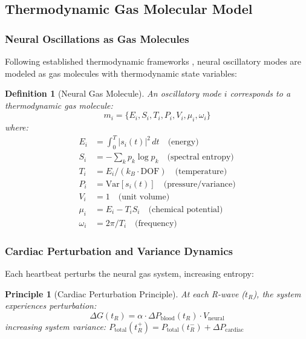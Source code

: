 \documentclass[12pt]{article}
\newtheorem{definition}[theorem]{Definition}
\newtheorem{principle}[theorem]{Principle}
\theoremstyle{remark}
\begin{document}
\subsection{Thermodynamic Gas Molecular Model}

\subsubsection{Neural Oscillations as Gas Molecules}

Following established thermodynamic frameworks \citep{friston2006free,sagawa2012thermodynamics}, neural oscillatory modes are modeled as gas molecules with thermodynamic state variables:

\begin{definition}[Neural Gas Molecule]
An oscillatory mode $i$ corresponds to a thermodynamic gas molecule:
\begin{equation}
m_i = \{E_i, S_i, T_i, P_i, V_i, \mu_i, \omega_i\}
\end{equation}
where:
\begin{align}
E_i &= \int_0^T |s_i(t)|^2 \, dt \quad \text{(energy)} \\
S_i &= -\sum_k p_k \log p_k \quad \text{(spectral entropy)} \\
T_i &= E_i / (k_B \cdot \text{DOF}) \quad \text{(temperature)} \\
P_i &= \text{Var}[s_i(t)] \quad \text{(pressure/variance)} \\
V_i &= 1 \quad \text{(unit volume)} \\
\mu_i &= E_i - T_i S_i \quad \text{(chemical potential)} \\
\omega_i &= 2\pi/T_i \quad \text{(frequency)}
\end{align}
\end{definition}

\subsubsection{Cardiac Perturbation and Variance Dynamics}

Each heartbeat perturbs the neural gas system, increasing entropy:

\begin{principle}[Cardiac Perturbation Principle]
At each R-wave ($t_R$), the system experiences perturbation:
\begin{equation}
\Delta G(t_R) = \alpha \cdot \Delta P_{\text{blood}}(t_R) \cdot V_{\text{neural}}
\end{equation}
increasing system variance: $P_{\text{total}}(t_R^+) = P_{\text{total}}(t_R^-) + \Delta P_{\text{cardiac}}$
\end{principle}
\end{document}
